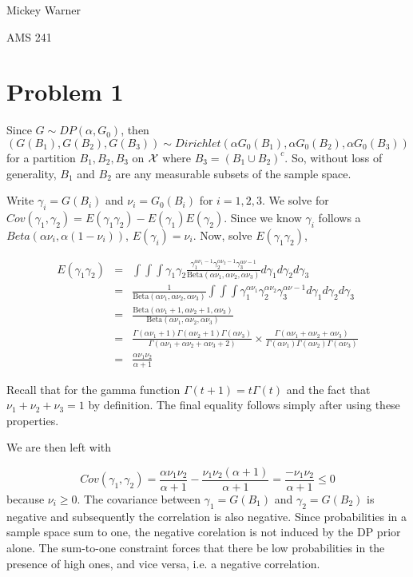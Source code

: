 \documentclass[12pt]{article}
\begin{document}
\noindent Mickey Warner

\noindent AMS 241

\section*{Problem 1}

\noindent Since $G\sim DP(\alpha, G_0)$, then
\[ (G(B_1), G(B_2), G(B_3)) \sim Dirichlet(\alpha G_0(B_1), \alpha G_0(B_2), \alpha G_0(B_3)) \]
for a partition $B_1, B_2, B_3$ on $\cal{X}$ where $B_3=(B_1 \cup B_2)^c$. So, without loss of generality, $B_1$ and $B_2$ are any measurable subsets of the sample space.
\bigskip

\noindent Write $\gamma_i = G(B_i)$ and $\nu_i = G_0(B_i)$ for $i=1,2,3$. We solve for $Cov(\gamma_1, \gamma_2) = E(\gamma_1\gamma_2) - E(\gamma_1)E(\gamma_2)$. Since we know $\gamma_i$ follows a $Beta(\alpha \nu_i, \alpha (1 - \nu_i))$, $E(\gamma_i)=\nu_i$. Now, solve $E(\gamma_1\gamma_2)$,

\addtolength{\jot}{18pt}
\begin{eqnarray*}
E(\gamma_1\gamma_2) &=& \int\int\int \gamma_1\gamma_2\frac{\gamma_1^{\alpha \nu_1-1} \gamma_2^{\alpha \nu_2-1} \gamma_3^{\alpha \nu-1}}{\mathrm{Beta}(\alpha \nu_1,\alpha \nu_2,\alpha \nu_3)}d\gamma_1d\gamma_2d\gamma_3 \\
&=& \frac{1}{\mathrm{Beta}(\alpha \nu_1,\alpha \nu_2,\alpha \nu_3)} \int\int\int \gamma_1^{\alpha \nu_1} \gamma_2^{\alpha \nu_2} \gamma_3^{\alpha \nu-1}d\gamma_1d\gamma_2d\gamma_3 \\
&=& \frac{\mathrm{Beta}(\alpha \nu_1+1,\alpha \nu_2+1,\alpha \nu_3)}{\mathrm{Beta}(\alpha \nu_1,\alpha \nu_2,\alpha \nu_3)} \\
&=& \frac{\Gamma(\alpha\nu_1 + 1)\Gamma(\alpha\nu_2+1)\Gamma(\alpha\nu_3)}{\Gamma(\alpha\nu_1 + \alpha\nu_2 + \alpha\nu_3 + 2)}\times\frac{\Gamma(\alpha\nu_1 + \alpha\nu_2 + \alpha\nu_3)}{\Gamma(\alpha\nu_1)\Gamma(\alpha\nu_2)\Gamma(\alpha\nu_3)} \\
&=& \frac{\alpha\nu_1\nu_2}{\alpha+1}
\end{eqnarray*}

\noindent Recall that for the gamma function $\Gamma(t+1)=t\Gamma(t)$ and the fact that $\nu_1+\nu_2+\nu_3=1$ by definition. The final equality follows simply after using these properties.
\bigskip

\noindent We are then left with

\[ Cov(\gamma_1, \gamma_2) = \frac{\alpha\nu_1\nu_2}{\alpha+1} - \frac{\nu_1\nu_2(\alpha+1)}{\alpha+1} = \frac{-\nu_1\nu_2}{\alpha+1} \leq 0\]
because $\nu_i\geq 0$. The covariance between $\gamma_1=G(B_1)$ and $\gamma_2=G(B_2)$ is negative and subsequently the correlation is also negative. Since probabilities in a sample space sum to one, the negative corelation is not induced by the DP prior alone. The sum-to-one constraint forces that there be low probabilities in the presence of high ones, and vice versa, i.e. a negative correlation.
\end{document}
